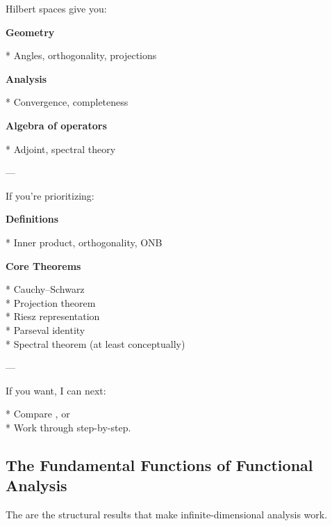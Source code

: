 \documentclass[12pt,a4paper]{report}
\begin{document}
\begin{description}
\item {}

Hilbert spaces give you:

\begin{description}
\item \textbf{Geometry}

* Angles, orthogonality, projections

\item \textbf{Analysis}

* Convergence, completeness

\item \textbf{Algebra of operators}

* Adjoint, spectral theory

\end{description}
---

\item {}

If you’re prioritizing:

\begin{description}
\item \textbf{Definitions}

* Inner product, orthogonality, ONB

\item \textbf{Core Theorems}

* Cauchy–Schwarz \\
* Projection theorem \\
* Riesz representation \\
* Parseval identity \\
* Spectral theorem (at least conceptually) \\

\end{description}
---

\end{description}

If you want, I can next:

* Compare , or \\
* Work through  step-by-step.


\newpage
\subsection*{The Fundamental Functions of Functional Analysis}


The  are the structural results that make infinite-dimensional analysis work.
\end{document}
